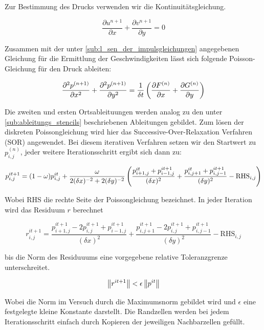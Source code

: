 		Zur Bestimmung des Drucks verwenden wir die Kontinuitätsgleichung.

		\[ \frac{\partial u^{n+1}}{\partial x} + \frac{\partial v^{n+1}}{\partial y} = 0\]

		Zusammen mit der unter \ref{sub:l_sen_der_impulsgleichungen} angegebenen Gleichung für die Ermittlung der Geschwindigkeiten lässt sich folgende Poisson-Gleichung für den Druck ableiten:

		\[ \frac{\partial ^{2} p^{(n+1)}}{\partial x^{2}} + \frac{\partial ^{2} p^{(n+1)}}{\partial y^{2}} = 
		\frac{1}{\delta t} \left(  \frac{\partial F^{(n)}}{\partial x} + \frac{\partial G^{(n)}}{\partial y}  \right) \]

		Die zweiten und ersten Ortsableituungen werden analog zu den unter \ref{sub:ableitungs_stencils} beschriebenen Ableitungen gebildet.
		Zum lösen der diskreten Poissongleichung wird hier das Successive-Over-Relaxation Verfahren (SOR) angewendet.
		Bei diesem iterativen Verfahren setzen wir den Startwert zu $p_{i,j} ^{(n)}$, jeder weitere Iterationsschritt ergibt sich dann zu:

		\[ p_{i,j} ^{it+1} = (1- \omega) p_{i,j}^{it} + \frac{\omega}{2 (\delta x)^{-2} + 2 (\delta y)^{-2}} 
		\left(  \frac{ p_{i+1,j}^{it} + p_{i-1,j}^{it+1} }{(\delta x)^2} + \frac{ p_{i,j+1}^{it} + p_{i,j-1}^{it+1} }{(\delta y)^2} - \text{RHS}_{i,j}  \right) \]

		Wobei RHS die rechte Seite der Poissongleichung bezeichnet.
		In jeder Iteration wird das Residuum $r$ berechnet 

		\[ r_{i,j}^{it+1} = \frac{ p_{i+1,j}^{it+1} - 2 p_{i,j}^{it+1} + p_{i-1,j}^{it+1} }{ (\delta x)^2 } + 
		\frac{ p_{i,j+1}^{it+1} - 2 p_{i,j}^{it+1} + p_{i,j-1}^{it+1} }{ (\delta y)^2 } - \text{RHS}_{i,j}\]

		bis die Norm des Residuuums eine vorgegebene relative Toleranzgrenze unterschreitet.

		\[ \left\| r^{it+1} \right\| < \epsilon \left\| p^{it} \right\| \]

		Wobei die Norm im Versuch durch die Maximumsnorm gebildet wird und $\epsilon$ eine festgelegte kleine Konstante darstellt.
		Die Randzellen werden bei jedem Iterationsschritt einfach durch Kopieren der jeweiligen Nachbarzellen gefüllt.



